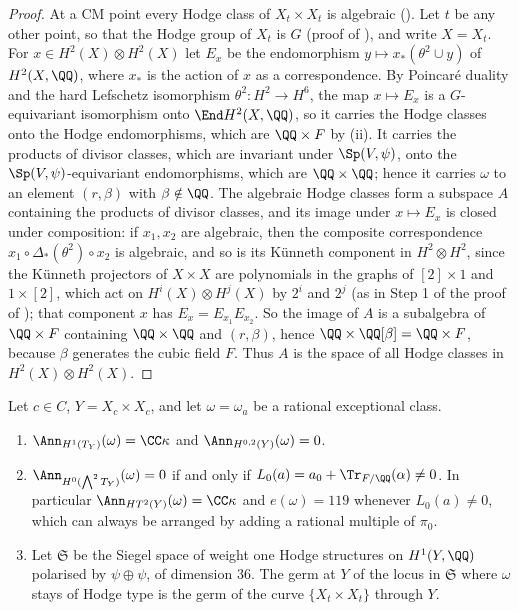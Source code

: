 \begin{proof}
At a CM point every Hodge class of $X_{t}\times X_{t}$ is algebraic
(). Let $t$ be any other point, so that the Hodge group
of $X_{t}$ is $G$ (proof of ), and write $X=X_{t}$.
For $x\in H^{2}(X)\otimes H^{2}(X)$ let $E_{x}$ be the endomorphism $y\mapsto x_{*}(\theta^{2}\cup y)$ of $H^{2}(X,\QQ)$, where
$x_{*}$ is the action of $x$ as a correspondence. By Poincar\'e duality and
the hard Lefschetz isomorphism $\theta^{2}\colon H^{2}\to H^{6}$, the map
$x\mapsto E_{x}$ is a $G$-equivariant isomorphism onto $\End H^{2}(X,\QQ)$,
so it carries the Hodge classes onto the Hodge endomorphisms, which are
$\QQ\times F$ by (ii). It carries the products of
divisor classes, which are invariant under $\Sp(V,\psi)$, onto the
$\Sp(V,\psi)$-equivariant endomorphisms, which are $\QQ\times\QQ$; hence it
carries $\omega$ to an element $(r,\beta)$ with $\beta\notin\QQ$. The
algebraic Hodge classes form a subspace $A$ containing the products of divisor
classes, and its image under $x\mapsto E_{x}$ is closed under composition:
if $x_{1},x_{2}$ are algebraic, then the composite correspondence $x_{1}\circ\Delta_{*}(\theta^{2})\circ
x_{2}$ is algebraic, and so is its K\"unneth component in
$H^{2}\otimes H^{2}$, since the K\"unneth projectors of $X\times X$ are
polynomials in the graphs of $[2]\times1$ and $1\times[2]$, which act on
$H^{i}(X)\otimes H^{j}(X)$ by $2^{i}$ and $2^{j}$ (as in Step 1 of the proof
of ); that component $x$ has
$E_{x}=E_{x_{1}}E_{x_{2}}$. So the image of $A$ is a subalgebra of
$\QQ\times F$ containing $\QQ\times\QQ$ and $(r,\beta)$, hence
$\QQ\times\QQ[\beta]=\QQ\times F$, because $\beta$ generates the cubic
field $F$. Thus $A$ is the space of all Hodge classes in
$H^{2}(X)\otimes H^{2}(X)$.
\end{proof}

\begin{theorem}\label{thm:mumfordrigid}
Let $c\in C$, $Y=X_{c}\times X_{c}$, and let $\omega=\omega_{a}$ be a
rational exceptional class.
\begin{enumerate}[label=\textup{(\roman*)},leftmargin=2.6em,itemsep=2pt]
\item $\Ann_{H^{1}(T_{Y})}(\omega)=\CC\kappa$ and
  $\Ann_{H^{0,2}(Y)}(\omega)=0$.
\item $\Ann_{H^{0}(\bigwedge^{2}T_{Y})}(\omega)=0$ if and only if
  $L_{0}(a)=a_{0}+\Tr_{F/\QQ}(\alpha)\ne0$. In particular
  $\Ann_{HT^{2}(Y)}(\omega)=\CC\kappa$ and $e(\omega)=119$ whenever
  $L_{0}(a)\ne0$, which can always be arranged by adding a rational multiple
  of $\pi_{0}$.
\item Let $\mathfrak{S}$ be the Siegel space of weight one Hodge structures on
  $H^{1}(Y,\QQ)$ polarised by $\psi\oplus\psi$, of dimension $36$. The germ at
  $Y$ of the locus in $\mathfrak{S}$ where $\omega$ stays of Hodge type is the
  germ of the curve $\{X_{t}\times X_{t}\}$ through $Y$.
\end{enumerate}
\end{theorem}

